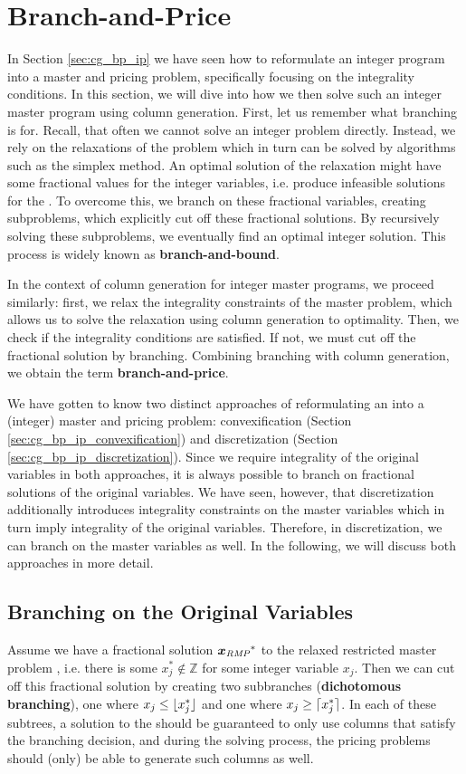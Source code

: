 \section{Branch-and-Price}\label{sec:cg_bp_bp}
In Section \ref{sec:cg_bp_ip} we have seen how to reformulate an integer program into a master and pricing problem, specifically focusing on the integrality conditions. In this section, we will dive into how we then solve such an integer master program using column generation. First, let us remember what branching is for. Recall, that often we cannot solve an integer problem directly. Instead, we rely on the \LP{} relaxations of the problem which in turn can be solved by algorithms such as the simplex method. An optimal solution of the \LP{} relaxation might have some fractional values for the integer variables, i.e. produce infeasible solutions for the \IP{}. To overcome this, we branch on these fractional variables, creating subproblems, which explicitly cut off these fractional solutions. By recursively solving these subproblems, we eventually find an optimal integer solution. This process is widely known as \textbf{branch-and-bound}.

In the context of column generation for integer master programs, we proceed similarly: first, we relax the integrality constraints of the master problem, which allows us to solve the relaxation using column generation to optimality. Then, we check if the integrality conditions are satisfied. If not, we must cut off the fractional solution by branching. Combining branching with column generation, we obtain the term \textbf{branch-and-price}.

We have gotten to know two distinct approaches of reformulating an \IP{} into a (integer) master and pricing problem: convexification (Section \ref{sec:cg_bp_ip_convexification}) and discretization (Section \ref{sec:cg_bp_ip_discretization}). Since we require integrality of the original variables in both approaches, it is always possible to branch on fractional solutions of the original variables. We have seen, however, that discretization additionally introduces integrality constraints on the master variables which in turn imply integrality of the original variables. Therefore, in discretization, we can branch on the master variables as well. In the following, we will discuss both approaches in more detail.

\subsection{Branching on the Original Variables}\label{sec:cg_bp_bp_branching_original}
Assume we have a fractional solution ${\bm{x}}_{\textit{RMP}}{}^*$ to the relaxed restricted master problem \RMP{}, i.e. there is some $x_j^* \not\in \mathbb{Z}$ for some integer variable $x_j$. Then we can cut off this fractional solution by creating two subbranches (\textbf{dichotomous branching}), one where $x_j \leq \lfloor x_j^*\rfloor$ and one where $x_j \geq \lceil x_j^*\rceil$. In each of these subtrees, a solution to the \RMP{} should be guaranteed to only use columns that satisfy the branching decision, and during the solving process, the pricing problems should (only) be able to generate such columns as well.


